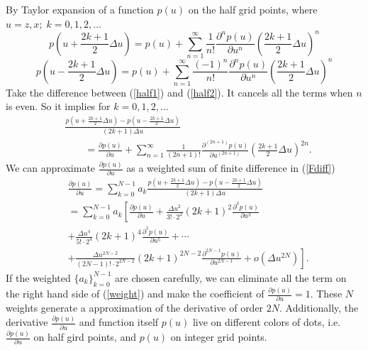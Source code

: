 \documentclass[11pt]{article}
\theoremstyle{plain}
\theoremstyle{definition}
\theoremstyle{remark}
\numberwithin{equation}{section}
\begin{document}
By Taylor expansion of a function $p(u)$ on the half grid points, where $u = z, x; \; k = 0, 1, 2, \dots $
  \begin{equation}\label{half1}
      p\left(u + \frac{2k+1}{2}\Delta u\right) = p(u) + \sum\limits_{n=1}^{\infty} \frac{1}{n!}\frac{\partial^n p(u)}{\partial u^n}\left(\frac{2k+1}{2}\Delta u\right)^n 
      \end{equation}
      \begin{equation}\label{half2}
      p\left(u - \frac{2k+1}{2}\Delta u\right) = p(u) + \sum\limits_{n=1}^{\infty} \frac{(-1)^n}{n!}\frac{\partial^n p(u)}{\partial u^n}\left(\frac{2k+1}{2}\Delta u\right)^n
  \end{equation}
  Take the difference between (\ref{half1}) and (\ref{half2}). It cancels all the terms when $n$ is even.
So it implies for $k = 0, 1, 2, \dots$
\begin{equation}    \label{Fdiff}
    \begin{aligned}
   &  \frac{p\left(u + \frac{2k+1}{2}\Delta u\right) - p\left(u - \frac{2k+1}{2}\Delta u\right)}{(2k+1)\Delta u}\\
    &~~~~~~~~~  =  \frac{\partial p(u)}{\partial u} + \sum\limits_{n=1 }^{\infty} \frac{1}{(2n+1)!}\frac{\partial^{(2n+1)} p(u)}{\partial u^{(2n+1)}}\left(\frac{2k+1}{2}\Delta u\right)^{2n}.
    \end{aligned}
    \end{equation}
We can approximate $\frac{\partial p(u)}{\partial u}$ as a weighted sum of finite difference in (\ref{Fdiff})
  \begin{equation}\label{weight}
  \begin{aligned}
    &\frac{\partial p(u)}{\partial u} = \sum\limits_{k=0}^{N-1} a_k \frac{p\left(u + \frac{2k+1}{2}\Delta u\right) - p\left(u - \frac{2k+1}{2}\Delta u\right)}{(2k+1)\Delta u} \\
    &= \sum\limits_{k=0}^{N-1} a_k \left[ \frac{\partial p(u)}{\partial u} + \frac{\Delta u^2}{3! \cdot 2^2}(2k+1)^2\frac{\partial^3 p(u)}{\partial u^3} \right.\\&\left. + \frac{\Delta u^4}{5! \cdot 2^4}(2k+1)^4\frac{\partial^5 p(u)}{\partial u^5} + \cdots \right.\\&\left. + \frac{\Delta u^{2N-2}}{(2N-1)! \cdot 2^{2N-2}}(2k+1)^{2N-2}\frac{\partial^{2N-1} p(u)}{\partial u^{2N-1}} + o(\Delta u^{2N}) \right].
  \end{aligned}
  \end{equation}
If the weighted $\{ a_k\}_{k=0}^{N-1}$ are chosen carefully, we can eliminate all the term on the right hand side of (\ref{weight}) and make the coefficient of $\frac{\partial p(u)}{\partial u} =1$. These $N$ weights generate a approximation of the derivative of order $2N$. Additionally, the derivative $\frac{\partial p(u)}{\partial u}$ and function itself $p(u)$ live on different colors of dots, i.e. $\frac{\partial p(u)}{\partial u}$ on half gird points, and $p(u)$ on integer grid points.
\end{document}
